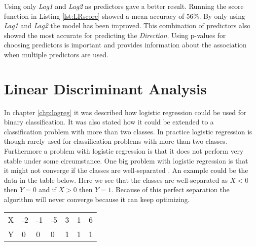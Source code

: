 Using only \emph{Lag1} and \emph{Lag2} as predictors gave a better result. Running the score function in Listing \ref{lst:LRscore} showed a mean accuracy of $56\%$. By only using \emph{Lag1} and \emph{Lag2} the model has been improved. This combination of predictors also showed the most accurate for predicting the \emph{Direction}. Using p-values for choosing predictors is important and provides information about the association when multiple predictors  are used.



\section{Linear Discriminant Analysis}
\label{chp:lindisana}

In chapter \ref{chp:logreg} it was described how logistic regression could be used for binary classification. It was also stated how it could be extended to  a classification problem with more than two classes. In practice logistic regression is though rarely used for classification problems with more than two classes. Furthermore a problem with logistic regression is that it does not perform very stable under some circumstance. One big problem with logistic regression is that it might not converge if the classes are well-separated  \citep{convergencefailure}. An example could be the data in the table below. Here we see that the classes are well-separated as $X<0$ then $Y=0$ and if $X>0$ then $Y=1$. Because of this perfect separation the algorithm will never converge because it can keep optimizing.

\begin{center} 
	\begin{tabular}{l|llllll}
		X & -2 & -1 & -5 & 3 & 1 & 6 \\[0.05cm] 
		Y &  0 &  0 &  0 & 1 & 1 & 1  \\[0.05cm] 
	\end{tabular}
\end{center}

